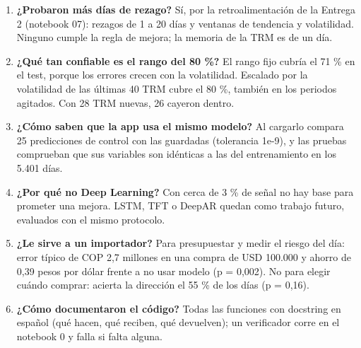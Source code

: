\documentclass[11pt,letterpaper]{article}
\begin{document}
\begin{enumerate}
\item \textbf{¿Probaron más días de rezago?} Sí, por la retroalimentación de la Entrega 2 (notebook 07): rezagos de 1 a 20 días y ventanas de tendencia y volatilidad. Ninguno cumple la regla de mejora; la memoria de la TRM es de un día.
\item \textbf{¿Qué tan confiable es el rango del 80 \%?} El rango fijo cubría el 71 \% en el test, porque los errores crecen con la volatilidad. Escalado por la volatilidad de las últimas 40 TRM cubre el 80 \%, también en los periodos agitados. Con 28 TRM nuevas, 26 cayeron dentro.
\item \textbf{¿Cómo saben que la app usa el mismo modelo?} Al cargarlo compara 25 predicciones de control con las guardadas (tolerancia 1e-9), y las pruebas comprueban que sus variables son idénticas a las del entrenamiento en los 5.401 días.
\item \textbf{¿Por qué no Deep Learning?} Con cerca de 3 \% de señal no hay base para prometer una mejora. LSTM, TFT o DeepAR quedan como trabajo futuro, evaluados con el mismo protocolo.
\item \textbf{¿Le sirve a un importador?} Para presupuestar y medir el riesgo del día: error típico de COP 2,7 millones en una compra de USD 100.000 y ahorro de 0,39 pesos por dólar frente a no usar modelo (p = 0,002). No para elegir cuándo comprar: acierta la dirección el 55 \% de los días (p = 0,16).
\item \textbf{¿Cómo documentaron el código?} Todas las funciones con docstring en español (qué hacen, qué reciben, qué devuelven); un verificador corre en el notebook 0 y falla si falta alguna.
\end{enumerate}
\end{document}
